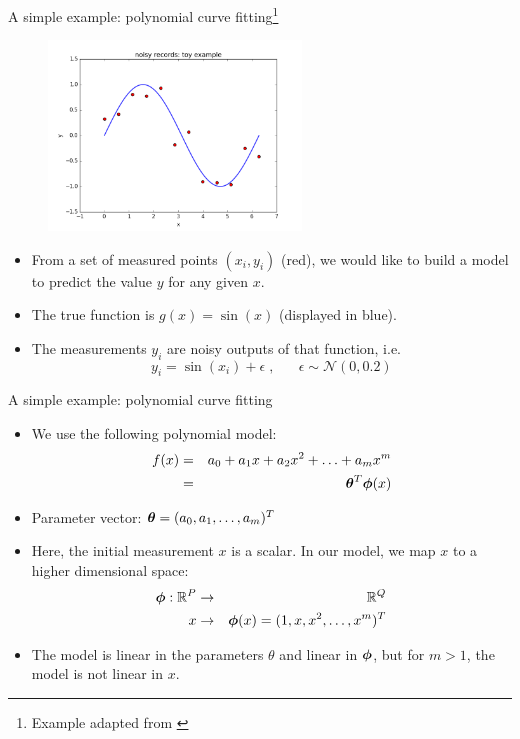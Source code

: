 \documentclass[xcolor=pdftex,dvipsnames,table]{beamer}
\begin{document}
\begin{frame}{A simple example: polynomial curve fitting\footnote{Example adapted from \cite{Bishop2006}}}
\begin{figure}[htb]
\includegraphics[width=0.6\textwidth]{../graphics/sample_from_sin.png}
\end{figure}
\begin{itemize}
	\item From a set of measured points $(x_i, y_i)$ (red), we would like to build a model to predict the value $y$ for any given $x$.
	\item The true function is $g(x)=\sin (x)$ (displayed in blue).
	\item The measurements $y_i$ are noisy outputs of that function, i.e.
	\begin{equation}
	y_i = \sin (x_i) + \epsilon \; , \;\;\; \;\;\; \epsilon \sim \mathcal{N}(0,0.2)
	\end{equation}
\end{itemize}
\end{frame}

\begin{frame}{A simple example: polynomial curve fitting}
\begin{itemize}
	\item We use the following polynomial model:
	\begin{eqnarray}
	f(x) &=& a_0 + a_1 x + a_2 x^2 + \ldots + a_m x^m \nonumber \\
	&=& \boldsymbol{\theta}^T \boldsymbol{\phi} (x)
	\end{eqnarray}
	\item Parameter vector: $\boldsymbol{\theta} = (a_0, a_1, \ldots, a_m)^T$
	\item Here, the initial measurement $x$ is a scalar. In our model, we map $x$ to a higher dimensional space:
	\begin{eqnarray}
		\boldsymbol{\phi} : \mathbb{R}^{P} &\rightarrow & \mathbb{R}^Q \nonumber \\
		x &\rightarrow & \boldsymbol{\phi} (x) = (1, x, x^2, \ldots, x^m)^T
	\end{eqnarray}
	\item The model is linear in the parameters $\theta$ and linear in $\boldsymbol{\phi}$, but for $m>1$, the model is not linear in $x$.
\end{itemize}
\end{frame}
\end{document}
